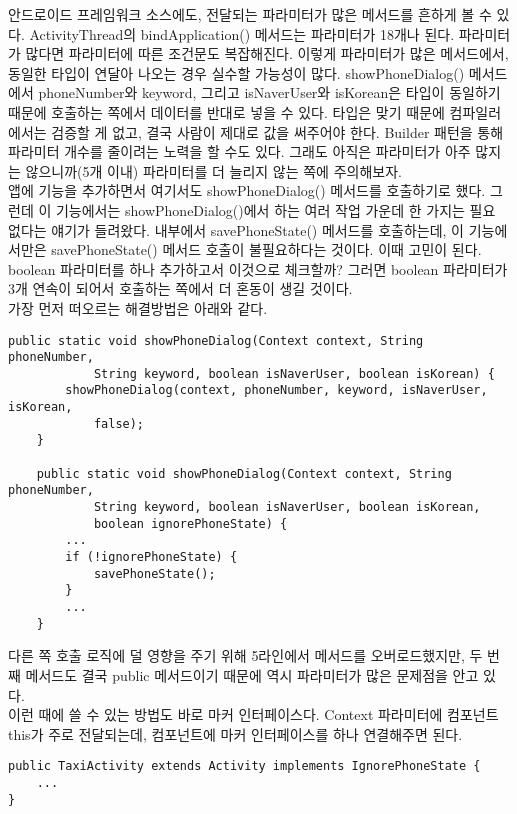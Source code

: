 안드로이드 프레임워크 소스에도, 전달되는 파라미터가 많은 메서드를 흔하게 볼 수 있다. ActivityThread의 bindApplication() 메서드는 파라미터가 18개나 된다.
파라미터가 많다면 파라미터에 따른 조건문도 복잡해진다.
이렇게 파라미터가 많은 메서드에서, 동일한 타입이 연달아 나오는 경우 실수할 가능성이 많다. 
showPhoneDialog() 메서드에서 phoneNumber와 keyword, 그리고 isNaverUser와 isKorean은 타입이 동일하기 때문에 호출하는 쪽에서 데이터를 반대로 넣을 수 있다.
타입은 맞기 때문에 컴파일러에서는 검증할 게 없고, 결국 사람이 제대로 값을 써주어야 한다.
Builder 패턴을 통해 파라미터 개수를 줄이려는 노력을 할 수도 있다. 그래도 아직은 파라미터가 아주 많지는 않으니까(5개 이내) 파라미터를 더 늘리지 않는 쪽에 주의해보자.\\

앱에 기능을 추가하면서 여기서도 showPhoneDialog() 메서드를 호출하기로 했다.
그런데 이 기능에서는 showPhoneDialog()에서 하는 여러 작업 가운데 한 가지는 필요 없다는 얘기가 들려왔다. 
내부에서 savePhoneState() 메서드를 호출하는데, 이 기능에서만은 savePhoneState() 메서드 호출이 불필요하다는 것이다.
이때 고민이 된다. boolean 파라미터를 하나 추가하고서 이것으로 체크할까? 
그러면 boolean 파라미터가 3개 연속이 되어서 호출하는 쪽에서 더 혼동이 생길 것이다.\\

가장 먼저 떠오르는 해결방법은 아래와 같다.
\begin{lstlisting}[frame=single]
	public static void showPhoneDialog(Context context, String phoneNumber, 
			String keyword, boolean isNaverUser, boolean isKorean) {
		showPhoneDialog(context, phoneNumber, keyword, isNaverUser, isKorean, 
			false);
	}

	public static void showPhoneDialog(Context context, String phoneNumber, 
			String keyword, boolean isNaverUser, boolean isKorean, 
			boolean ignorePhoneState) {
		...
		if (!ignorePhoneState) {
			savePhoneState();
		}
		...
	}
\end{lstlisting}
다른 쪽 호출 로직에 덜 영향을 주기 위해 5라인에서 메서드를 오버로드했지만, 두 번째 메서드도 결국 public 메서드이기 때문에 역시 파라미터가 많은 문제점을 안고 있다.\\ 

이런 때에 쓸 수 있는 방법도 바로 마커 인터페이스다. Context 파라미터에 컴포넌트 this가 주로 전달되는데, 컴포넌트에 마커 인터페이스를 하나 연결해주면 된다.

\begin{lstlisting}[frame=single]
public TaxiActivity extends Activity implements IgnorePhoneState {
	...
}
\end{lstlisting}


